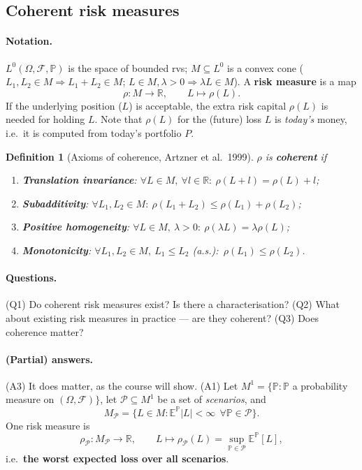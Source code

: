 \documentclass[11pt,a4paper]{article}
\newtheorem{definition}{Definition}
\newcommand{\real}{\mathbb{R}}
\newcommand{\E}{\mathbb{E}}
\renewcommand{\P}{\mathbb{P}}
\begin{document}
\subsection{Coherent risk measures}
\paragraph{Notation.} $L^0(\Omega,\mathcal{F},\P)$ is the space of bounded rvs; $M\subseteq
L^0$ is a convex cone ($L_1,L_2\in M\Rightarrow L_1+L_2\in M$; $L\in M,\lambda>0\Rightarrow\lambda L
\in M$). A \textbf{risk measure} is a map
\[
  \rho:M\to\real,\qquad L\mapsto\rho(L).
\]
If the underlying position ($L$) is acceptable, the extra risk capital $\rho(L)$ is needed for
holding $L$. Note that $\rho(L)$ for the (future) loss $L$ is \emph{today's} money, i.e.\ it is
computed from today's portfolio $P$.

\begin{definition}[Axioms of coherence, Artzner et al.\ 1999]
$\rho$ is \textbf{coherent} if
\begin{enumerate}[label=(Ax\arabic*),leftmargin=*]
  \item \textbf{Translation invariance}: $\forall L\in M,\ \forall l\in\real:\
        \rho(L+l)=\rho(L)+l$;
  \item \textbf{Subadditivity}: $\forall L_1,L_2\in M:\
        \rho(L_1+L_2)\le\rho(L_1)+\rho(L_2)$;
  \item \textbf{Positive homogeneity}: $\forall L\in M,\ \lambda>0:\ \rho(\lambda L)=\lambda\rho(L)$;
  \item \textbf{Monotonicity}: $\forall L_1,L_2\in M,\ L_1\le L_2$ (a.s.):\
        $\rho(L_1)\le\rho(L_2)$.
\end{enumerate}
\end{definition}

\paragraph{Questions.}
(Q1) Do coherent risk measures exist? Is there a characterisation?
(Q2) What about existing risk measures in practice --- are they coherent?
(Q3) Does coherence matter?

\paragraph{(Partial) answers.} (A3) It does matter, as the course will show.
(A1) Let $M^1=\{\P:\P$ a probability measure on $(\Omega,\mathcal{F})\}$, let
$\mathcal{P}\subseteq M^1$ be a set of \emph{scenarios}, and
\[
  M_{\mathcal{P}}=\big\{L\in M:\E^{\P}|L|<\infty\ \ \forall\P\in\mathcal{P}\big\}.
\]
One risk measure is
\[
  \rho_{\mathcal{P}}:M_{\mathcal{P}}\to\real,\qquad
  L\mapsto\rho_{\mathcal{P}}(L)=\sup_{\P\in\mathcal{P}}\E^{\P}[L],
\]
i.e.\ \textbf{the worst expected loss over all scenarios}.
\end{document}
